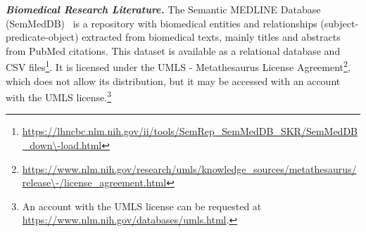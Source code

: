\noindent\textbf{\textit{Biomedical Research Literature.}} 
The Semantic MEDLINE Database (SemMedDB)~\parencite{SemMedDB} is a repository with biomedical entities and relationships (subject-predicate-object) extracted from biomedical texts, mainly titles and abstracts from PubMed citations. 
This dataset is available as a relational database and CSV files\footnote{\url{https://lhncbc.nlm.nih.gov/ii/tools/SemRep\_SemMedDB\_SKR/SemMedDB\_down\-load.html}}.
It is licensed under the UMLS - Metathesaurus License Agreement\footnote{\url{https://www.nlm.nih.gov/research/umls/knowledge\_sources/metathesaurus/release\-/license\_agreement.html}}, which does not allow its distribution, but it may be accessed with an account with the UMLS license.\footnote{An account with the UMLS license can be requested at \url{https://www.nlm.nih.gov/databases/umls.html}.}
